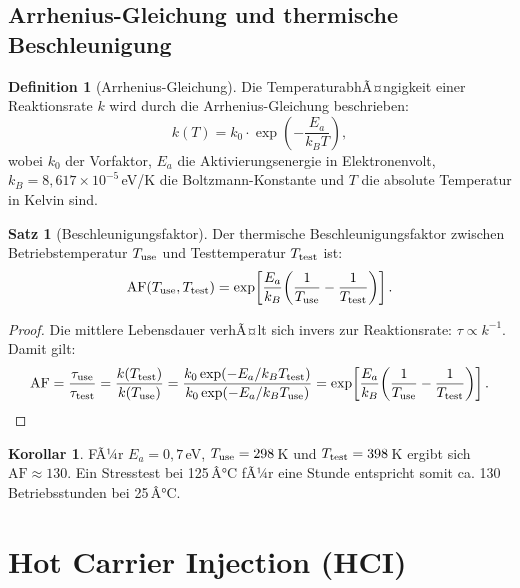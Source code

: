 ﻿\documentclass[a4paper,12pt]{article}
\theoremstyle{definition}
\newtheorem{definition}{Definition}
\newtheorem{satz}{Satz}
\newtheorem{korollar}{Korollar}
\begin{document}
\subsection{Arrhenius-Gleichung und thermische Beschleunigung}

\begin{definition}[Arrhenius-Gleichung]
	Die TemperaturabhÃ¤ngigkeit einer Reaktionsrate $k$ wird durch die
	Arrhenius-Gleichung beschrieben:
	\[
	k(T) = k_0 \cdot \exp\!\left(-\frac{E_a}{k_B T}\right),
	\]
	wobei $k_0$ der Vorfaktor, $E_a$ die Aktivierungsenergie in Elektronenvolt,
	$k_B = 8{,}617 \times 10^{-5}$\,eV/K die Boltzmann-Konstante und
	$T$ die absolute Temperatur in Kelvin sind.
\end{definition}

\begin{satz}[Beschleunigungsfaktor]
	\label{satz:af}
	Der thermische Beschleunigungsfaktor zwischen Betriebstemperatur $T_{\rm use}$
	und Testtemperatur $T_{\rm test}$ ist:
	\[
	\mathrm{AF}(T_{\rm use}, T_{\rm test}) = \exp\!\left[
	\frac{E_a}{k_B}\!\left(\frac{1}{T_{\rm use}} - \frac{1}{T_{\rm test}}\right)
	\right].
	\]
\end{satz}

\begin{proof}
	Die mittlere Lebensdauer verhÃ¤lt sich invers zur Reaktionsrate:
	$\tau \propto k^{-1}$. Damit gilt:
	\[
	\mathrm{AF} = \frac{\tau_{\rm use}}{\tau_{\rm test}}
	= \frac{k(T_{\rm test})}{k(T_{\rm use})}
	= \frac{k_0 \exp(-E_a / k_B T_{\rm test})}{k_0 \exp(-E_a / k_B T_{\rm use})}
	= \exp\!\left[\frac{E_a}{k_B}\!\left(\frac{1}{T_{\rm use}} - \frac{1}{T_{\rm test}}\right)\right].
	\qedhere
	\]
\end{proof}

\begin{korollar}
	FÃ¼r $E_a = 0{,}7$\,eV, $T_{\rm use} = 298$\,K und $T_{\rm test} = 398$\,K
	ergibt sich $\mathrm{AF} \approx 130$. Ein Stresstest bei 125\,Â°C fÃ¼r
	eine Stunde entspricht somit ca. 130 Betriebsstunden bei 25\,Â°C.
\end{korollar}

\section{Hot Carrier Injection (HCI)}
\label{sec:hci}
\end{document}
